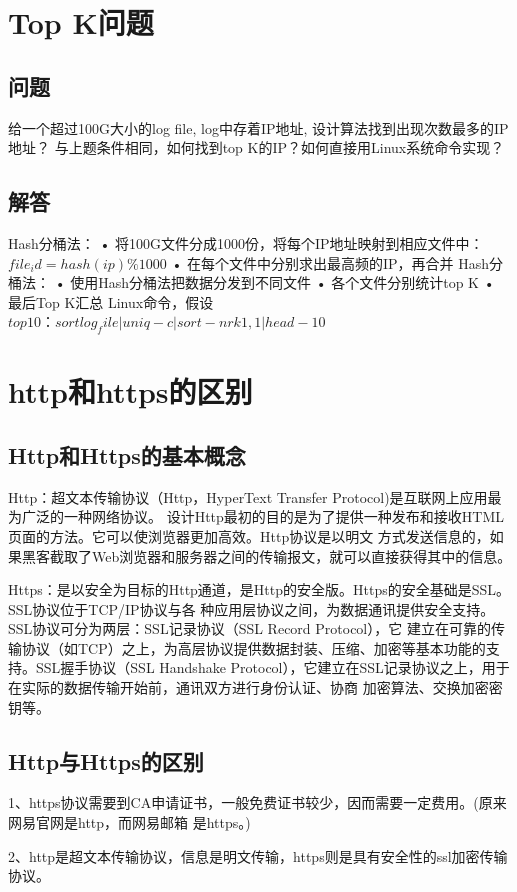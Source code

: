 \documentclass[UTF8]{ctexart}
\begin{document}
\section{Top K问题}
\subsection{问题}
给一个超过100G大小的log file, log中存着IP地址, 设计算法找到出现次数最多的IP地址？
与上题条件相同，如何找到top K的IP？如何直接用Linux系统命令实现？
\subsection{解答}
Hash分桶法： 
• 将100G文件分成1000份，将每个IP地址映射到相应文件中：$file_id = hash(ip) \% 1000 $
• 在每个文件中分别求出最高频的IP，再合并 Hash分桶法： 
• 使用Hash分桶法把数据分发到不同文件 
• 各个文件分别统计top K 
• 最后Top K汇总 
Linux命令，假设$top 10：sort log_file | uniq -c | sort -nr k1,1 | head -10$
\section{http和https的区别}
\subsection{Http和Https的基本概念}

Http：超文本传输协议（Http，HyperText Transfer Protocol)是互联网上应用最为广泛的一种网络协议。
设计Http最初的目的是为了提供一种发布和接收HTML页面的方法。它可以使浏览器更加高效。Http协议是以明文
方式发送信息的，如果黑客截取了Web浏览器和服务器之间的传输报文，就可以直接获得其中的信息。

Https：是以安全为目标的Http通道，是Http的安全版。Https的安全基础是SSL。SSL协议位于TCP/IP协议与各
种应用层协议之间，为数据通讯提供安全支持。SSL协议可分为两层：SSL记录协议（SSL Record Protocol），它
建立在可靠的传输协议（如TCP）之上，为高层协议提供数据封装、压缩、加密等基本功能的支持。SSL握手协议（SSL 
Handshake Protocol），它建立在SSL记录协议之上，用于在实际的数据传输开始前，通讯双方进行身份认证、协商
加密算法、交换加密密钥等。
\subsection{Http与Https的区别}
1、https协议需要到CA申请证书，一般免费证书较少，因而需要一定费用。(原来网易官网是http，而网易邮箱
	是https。)

2、http是超文本传输协议，信息是明文传输，https则是具有安全性的ssl加密传输协议。
\end{document}

